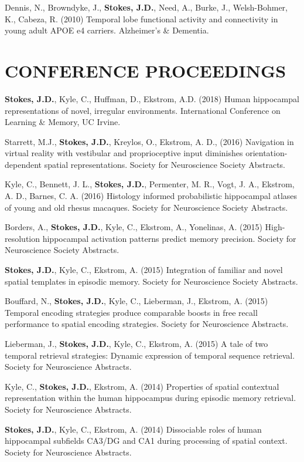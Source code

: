 \documentclass[line,margin,10pt]{res}
\begin{document}
\begin{resume}
Dennis, N., Browndyke, J., \textbf{Stokes, J.D.}, Need, A., Burke, J., Welsh-Bohmer, K., Cabeza, R. (2010) Temporal lobe functional activity and connectivity in young adult APOE e4 carriers. Alzheimer's \& Dementia.

\section{CONFERENCE PROCEEDINGS} 

\textbf{Stokes, J.D.}, Kyle, C., Huffman, D., Ekstrom, A.D. (2018) Human hippocampal representations of novel, irregular environments. International Conference on Learning \& Memory, UC Irvine.

Starrett, M.J., \textbf{Stokes, J.D.}, Kreylos, O., Ekstrom, A. D., (2016) Navigation in virtual reality with vestibular and proprioceptive input diminishes orientation-dependent spatial representations. Society for Neuroscience Society Abstracts.

Kyle, C., Bennett, J. L., \textbf{Stokes, J.D.}, Permenter, M. R., Vogt, J. A., Ekstrom, A. D., Barnes, C. A. (2016) Histology informed probabilistic hippocampal atlases of young and old rhesus macaques. Society for Neuroscience Society Abstracts.

Borders, A., \textbf{Stokes, J.D.}, Kyle, C., Ekstrom, A., Yonelinas, A. (2015) High-resolution hippocampal activation patterns predict memory precision. Society for Neuroscience Society Abstracts.

\textbf{Stokes, J.D.}, Kyle, C., Ekstrom, A. (2015) Integration of familiar and novel spatial templates in episodic memory. Society for Neuroscience Society Abstracts.

Bouffard, N., \textbf{Stokes, J.D.}, Kyle, C., Lieberman, J., Ekstrom, A. (2015) Temporal encoding strategies produce comparable boosts in free recall performance to spatial encoding strategies. Society for Neuroscience Abstracts.

Lieberman, J., \textbf{Stokes, J.D.}, Kyle, C., Ekstrom, A. (2015) A tale of two temporal retrieval strategies: Dynamic expression of temporal sequence retrieval. Society for Neuroscience Abstracts.

Kyle, C., \textbf{Stokes, J.D.}, Ekstrom, A. (2014) Properties of spatial contextual representation within the human hippocampus during episodic memory retrieval. Society for Neuroscience Abstracts.

\textbf{Stokes, J.D.}, Kyle, C., Ekstrom, A. (2014) Dissociable roles of human hippocampal subfields CA3/DG and CA1 during processing of spatial context. Society for Neuroscience Abstracts.


\end{resume}
\end{document}
